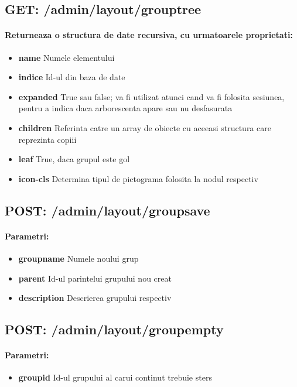  \subsection*{GET: /admin/layout/grouptree}

\paragraph{Returneaza o structura de date recursiva, cu urmatoarele proprietati:}
\begin{itemize}
\item \textbf{name}
 Numele elementului
\item \textbf{indice}
 Id-ul din baza de date
\item \textbf{expanded}
 True sau false; va fi utilizat atunci cand va fi folosita sesiunea, pentru a indica daca arborescenta apare sau nu desfasurata 
\item \textbf{children}
 Referinta catre un array de obiecte cu aceeasi structura care reprezinta copiii
\item \textbf{leaf}
 True, daca grupul este gol
\item \textbf{icon-cls}
 Determina tipul de pictograma folosita la nodul respectiv
 \end{itemize}
 \subsection*{POST: /admin/layout/groupsave}

\paragraph{Parametri:}
\begin{itemize}
\item \textbf{groupname}
 Numele noului grup
\item \textbf{parent}
 Id-ul parintelui grupului nou creat
\item \textbf{description}
 Descrierea grupului respectiv
 \end{itemize}
 \subsection*{POST: /admin/layout/groupempty}

\paragraph{Parametri:}
\begin{itemize}
\item \textbf{groupid}
 Id-ul grupului al carui continut trebuie sters
 \end{itemize}
